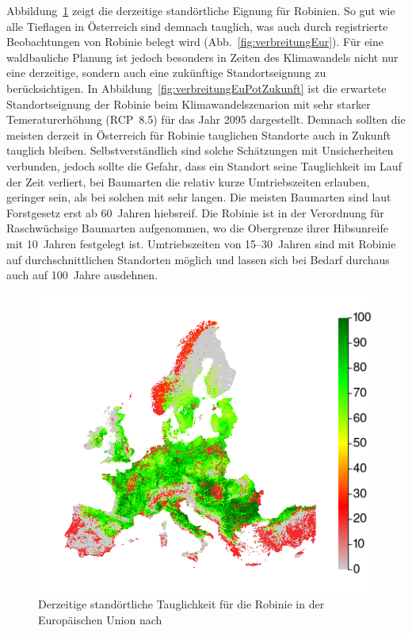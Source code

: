 \documentclass[twocolumn]{scrartcl}
\begin{document}
Abbildung~\ref{fig:verbreitungEuPot} zeigt die derzeitige standörtliche Eignung
für Robinien. So gut wie alle Tieflagen in Österreich sind demnach tauglich, was
auch durch registrierte Beobachtungen von Robinie belegt wird
(Abb.~\ref{fig:verbreitungEur}). Für eine waldbauliche Planung ist jedoch
besonders in Zeiten des Klimawandels nicht nur eine derzeitige, sondern auch
eine zukünftige Standortseignung zu berücksichtigen. In
Abbildung~\ref{fig:verbreitungEuPotZukunft} ist die erwartete Standortseignung
der Robinie beim Klimawandelszenarion mit sehr starker Temeraturerhöhung
(RCP~8.5) für das Jahr 2095 dargestellt. Demnach sollten die meisten derzeit in
Österreich für Robinie tauglichen Standorte auch in Zukunft tauglich bleiben.
Selbstverständlich sind solche Schätzungen mit Unsicherheiten verbunden, jedoch
sollte die Gefahr, dass ein Standort seine Tauglichkeit im Lauf der Zeit
verliert, bei Baumarten die relativ kurze Umtriebszeiten erlauben, geringer
sein, als bei solchen mit sehr langen. Die meisten Baumarten sind laut
Forstgesetz erst ab 60~Jahren hiebsreif. Die Robinie ist in der Verordnung für
Raschwüchsige Baumarten aufgenommen, wo die Obergrenze ihrer Hibsunreife mit
10~Jahren festgelegt ist. Umtriebszeiten von 15--30~Jahren sind mit Robinie auf
durchschnittlichen Standorten möglich und lassen sich bei Bedarf durchaus auch
auf 100~Jahre ausdehnen.

\begin{figure}[htbp]
  \centering
  \includegraphics[width=.9\linewidth]{./bild/potentialEuropaAtlas}
  \caption{Derzeitige standörtliche Tauglichkeit für die Robinie in der Europäischen Union nach \citet{jrc2016treeAtlas}}
  \label{fig:verbreitungEuPot}
\end{figure}
\end{document}
